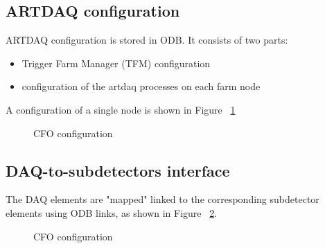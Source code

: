 \subsection{ARTDAQ configuration}

ARTDAQ configuration is stored in ODB. It consists of two parts:
\begin{itemize}
\item
  Trigger Farm Manager (TFM) configuration
\item
  configuration of the artdaq processes on each farm node
\end{itemize}

A configuration of a single node is shown in Figure ~\ref{figure:artdaq_configuration}

\begin{figure}[H]
  \caption{
    \label{figure:artdaq_configuration}
    CFO configuration
  }
\end{figure}

\subsection{DAQ-to-subdetectors interface}
The DAQ elements are "mapped" linked to the corresponding subdetector elements using ODB links,
as shown in Figure ~\ref{figure:daq_to_tracker_interface}.
\begin{figure}[H]
  \caption{
    \label{figure:daq_to_tracker_interface}
    CFO configuration
  }
\end{figure}


